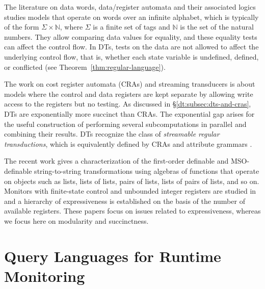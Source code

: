 The literature on data words, data/register automata and their associated logics \cite{KF1994FMA, NSV2004FSM, DL2009LFQ, BS2010NRDL, BDMSS2011LDW} studies models that operate on words over an infinite alphabet, which is typically of the form $\Sigma \times \mathbb{N}$, where $\Sigma$ is a finite set of tags and $\mathbb{N}$ is the set of the natural numbers. They allow comparing data values for equality, and these equality tests can affect the control flow.
In DTs, tests on the data are not allowed to affect the underlying control flow, that is, whether each state variable is undefined, defined, or conflicted (see Theorem~\ref{thm:regular-language}).

The work on cost register automata (CRAs) \cite{AdADRY2013CRA, AR2013ARF} and streaming transducers \cite{AC2010SST, AC2011STA, AdA2012STT} is about models where the control and data registers are kept separate by allowing write access to the registers but no testing. As discussed in \S\ref{dt:subsec:dts-and-cras}, DTs are exponentially more succinct than CRAs. The exponential gap arises for the useful construction of performing several subcomputations in parallel and combining their results. DTs recognize the class of \emph{streamable regular transductions}, which
is equivalently defined by CRAs and attribute grammars \cite{arXiv2018}.

The recent work \cite{BDK2018} gives a characterization of the first-order definable and MSO-definable string-to-string transformations using algebras of functions that operate on objects such as lists, lists of lists, pairs of lists, lists of pairs of lists, and so on. Monitors with finite-state control and unbounded integer registers are studied in \cite{FHS2018} and a hierarchy of expressiveness is established on the basis of the number of available registers. These papers focus on issues related to expressiveness, whereas we focus here on modularity and succinctness.

\section{Query Languages for Runtime Monitoring}

